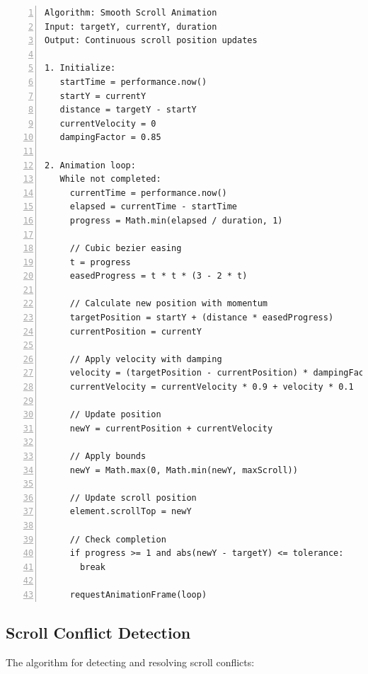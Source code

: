 \documentclass[10pt]{article}
\begin{document}
\begin{Verbatim}[frame=lines, numbers=left, tabsize=2, fontsize=\small, xleftmargin=1em, xrightmargin=1em, breaklines=true]
Algorithm: Smooth Scroll Animation
Input: targetY, currentY, duration
Output: Continuous scroll position updates

1. Initialize:
   startTime = performance.now()
   startY = currentY
   distance = targetY - startY
   currentVelocity = 0
   dampingFactor = 0.85

2. Animation loop:
   While not completed:
     currentTime = performance.now()
     elapsed = currentTime - startTime
     progress = Math.min(elapsed / duration, 1)
     
     // Cubic bezier easing
     t = progress
     easedProgress = t * t * (3 - 2 * t)
     
     // Calculate new position with momentum
     targetPosition = startY + (distance * easedProgress)
     currentPosition = currentY
     
     // Apply velocity with damping
     velocity = (targetPosition - currentPosition) * dampingFactor
     currentVelocity = currentVelocity * 0.9 + velocity * 0.1
     
     // Update position
     newY = currentPosition + currentVelocity
     
     // Apply bounds
     newY = Math.max(0, Math.min(newY, maxScroll))
     
     // Update scroll position
     element.scrollTop = newY
     
     // Check completion
     if progress >= 1 and abs(newY - targetY) <= tolerance:
       break
     
     requestAnimationFrame(loop)
\end{Verbatim}

\subsection{Scroll Conflict Detection}

The algorithm for detecting and resolving scroll conflicts:
\end{document}

